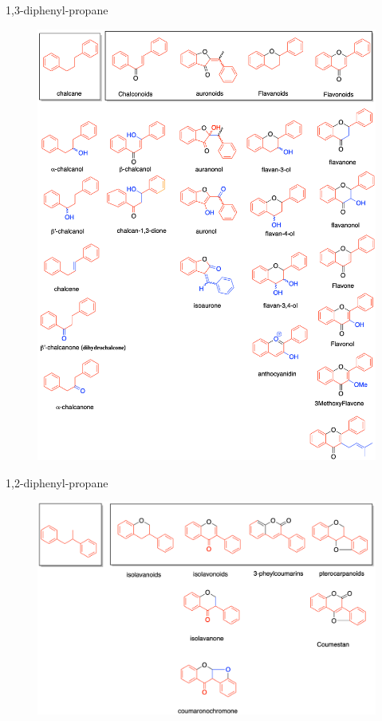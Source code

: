 \documentclass[11pt]{beamer}
\begin{document}
\begin{frame}{1,3-diphenyl-propane}
	\begin{figure}
		\centering
		\includegraphics[height=0.8\textheight]{a 1,3-diphenyl-propane skeleton.png}
	\end{figure}
\end{frame}
\begin{frame}{1,2-diphenyl-propane}
	\begin{figure}
		\centering
		\includegraphics[scale=0.5]{1,2-diphenylpropane skeleton.png}
	\end{figure}
\end{frame}
\end{document}
